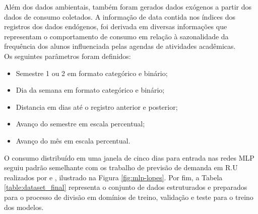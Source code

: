      	  Além dos dados ambientais, também foram gerados dados exógenos a partir dos dados de consumo coletados. A informação de data contida nos índices dos registros dos dados endógenos, foi derivada em diversas informações que representam o comportamento de consumo em relação à sazonalidade da frequência dos alunos influenciada pelas agendas de atividades acadêmicas.\\
            	Os seguintes parâmetros foram definidos:
            	\begin{itemize}
            	    \item Semestre 1 ou 2 em formato categórico e binário;
            	    \item Dia da semana em formato categórico e binário;
            	    \item Distancia em dias até o registro anterior e posterior;
            	    \item Avanço do semestre em escala percentual;
            	    \item Avanço do mês em escala percentual.
            	\end{itemize}
            	
            	O consumo distribuído em uma janela de cinco dias para entrada nas redes MLP seguiu padrão semelhante com os trabalho de previsão de demanda em R.U realizados por  e , ilustrado na Figura \ref{fig:mlp-lopes}. Por fim, a Tabela \ref{table:dataset_final} representa o conjunto de dados estruturados e preparados para o processo de divisão em domínios de treino, validação e teste para o treino dos modelos.

